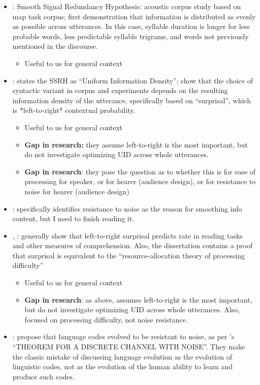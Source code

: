 \documentclass[11pt]{article}
\begin{document}
\begin{itemize}
	\item \citet{aylettturk2004}: Smooth Signal Redundancy Hypothesis: acoustic corpus study based on map task corpus; first demonstration that information is distributed as evenly as possible across utterances. In this case, syllable duration is longer for less probable words, less predictable syllable trigrams, and words not previously mentioned in the discourse.
	\begin{itemize}
		\item Useful to us for general context
	\end{itemize}
	\item \citet{levyjaeger2007}: states the SSRH as ``Uniform Information Density''; show that the choice of syntactic variant in corpus and experiments depends on the resulting information density of the utterance, specifically based on ``surprisal'', which is *left-to-right* contextual probability.
	\begin{itemize}
		\item Useful to us for general context
		\item \textbf{Gap in research:} they assume left-to-right is the most important, but do not investigate optimizing UID across whole utterances.
		\item \textbf{Gap in research}: they pose the question as to whether this is for ease of processing for speaker, or for hearer (audience design), or for resistance to noise for hearer (audience design)
	\end{itemize}
	\item \citet{levy2008a}: specifically identifies resistance to noise as the reason for smoothing info content, but I need to finish reading it.
	\item \citet{levy2005, levy2008}, \citet{smithlevy2013}: generally show that left-to-right surprisal predicts rate in reading tasks and other measures of comprehension. Also, the dissertation contains a proof that surprisal is equivalent to the ``resource-allocation theory of processing difficulty''
	\begin{itemize}
		\item Useful to us for general context
		\item \textbf{Gap in research}: as above, assumes left-to-right is the most important, but do not investigate optimizing UID across whole utterances. Also, focused on processing difficulty, not noise resistance.
	\end{itemize}
	\item \citet{plotkinnowak2000}: propose that language codes evolved to be resistant to noise, as per \citet{shannon1948}'s ``THEOREM FOR A DISCRETE CHANNEL WITH NOISE''. They make the classic mistake of discussing language evolution as the evolution of linguistic codes, not as the evolution of the human ability to learn and produce such codes.

\end{itemize}
\end{document}
